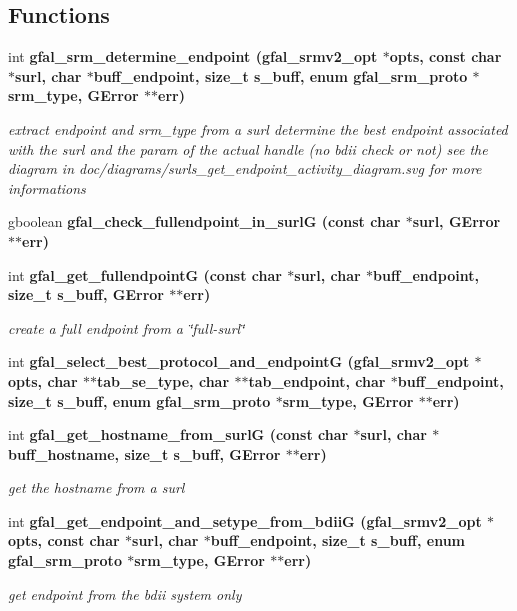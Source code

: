 \subsection*{Functions}
\begin{CompactItemize}
\item 
int \bf{gfal\_\-srm\_\-determine\_\-endpoint} (gfal\_\-srmv2\_\-opt $\ast$opts, const char $\ast$surl, char $\ast$buff\_\-endpoint, size\_\-t s\_\-buff, enum gfal\_\-srm\_\-proto $\ast$srm\_\-type, GError $\ast$$\ast$err)
\begin{CompactList}\small\item\em extract endpoint and srm\_\-type from a surl determine the best endpoint associated with the surl and the param of the actual handle (no bdii check or not) see the diagram in doc/diagrams/surls\_\-get\_\-endpoint\_\-activity\_\-diagram.svg for more informations \item\end{CompactList}\item 
gboolean \bf{gfal\_\-check\_\-fullendpoint\_\-in\_\-surl\-G} (const char $\ast$surl, GError $\ast$$\ast$err)
\item 
int \bf{gfal\_\-get\_\-fullendpoint\-G} (const char $\ast$surl, char $\ast$buff\_\-endpoint, size\_\-t s\_\-buff, GError $\ast$$\ast$err)\label{gfal__common__srm__endpoint_8c_fbb46a068ea2a908160cb7b998377ffd}

\begin{CompactList}\small\item\em create a full endpoint from a \char`\"{}full-surl\char`\"{} \item\end{CompactList}\item 
int \bf{gfal\_\-select\_\-best\_\-protocol\_\-and\_\-endpoint\-G} (gfal\_\-srmv2\_\-opt $\ast$opts, char $\ast$$\ast$tab\_\-se\_\-type, char $\ast$$\ast$tab\_\-endpoint, char $\ast$buff\_\-endpoint, size\_\-t s\_\-buff, enum gfal\_\-srm\_\-proto $\ast$srm\_\-type, GError $\ast$$\ast$err)
\item 
int \bf{gfal\_\-get\_\-hostname\_\-from\_\-surl\-G} (const char $\ast$surl, char $\ast$buff\_\-hostname, size\_\-t s\_\-buff, GError $\ast$$\ast$err)
\begin{CompactList}\small\item\em get the hostname from a surl \item\end{CompactList}\item 
int \bf{gfal\_\-get\_\-endpoint\_\-and\_\-setype\_\-from\_\-bdii\-G} (gfal\_\-srmv2\_\-opt $\ast$opts, const char $\ast$surl, char $\ast$buff\_\-endpoint, size\_\-t s\_\-buff, enum gfal\_\-srm\_\-proto $\ast$srm\_\-type, GError $\ast$$\ast$err)
\begin{CompactList}\small\item\em get endpoint from the bdii system only \item\end{CompactList}\end{CompactItemize}


